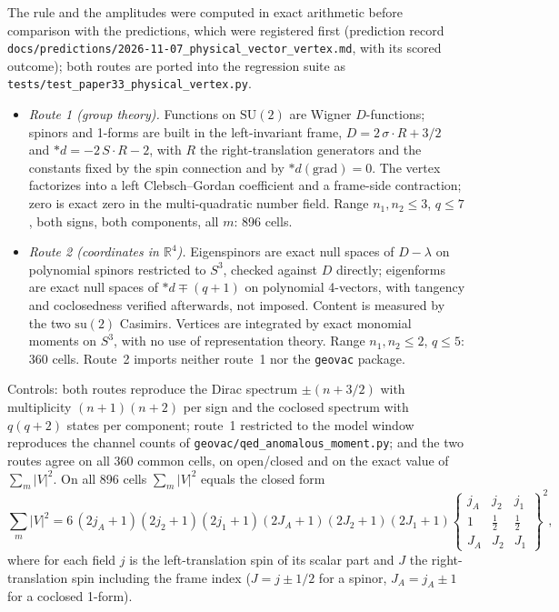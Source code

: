 \documentclass[11pt]{article}
\begin{document}
The rule and the amplitudes were computed in exact arithmetic before
comparison with the predictions, which were registered first
(prediction record
\texttt{docs/predictions/2026-11-07\_physical\_vector\_vertex.md},
with its scored outcome); both routes are ported into the regression
suite as \texttt{tests/test\_paper33\_physical\_vertex.py}.
\begin{itemize}
\item \emph{Route 1 (group theory).}  Functions on $\mathrm{SU}(2)$ are
  Wigner $D$-functions; spinors and 1-forms are built in the
  left-invariant frame, $D = 2\,\sigma\cdot R + 3/2$ and
  $*d = -2\,S\cdot R - 2$, with $R$ the right-translation generators and
  the constants fixed by the spin connection and by $*d(\mathrm{grad}) = 0$.
  The vertex factorizes into a left Clebsch--Gordan coefficient and a
  frame-side contraction; zero is exact zero in the multi-quadratic
  number field.  Range $n_1, n_2 \le 3$, $q \le 7$, both signs, both
  components, all $m$: 896 cells.
\item \emph{Route 2 (coordinates in $\mathbb{R}^4$).}  Eigenspinors are
  exact null spaces of $D - \lambda$ on polynomial spinors restricted to
  $S^3$, checked against $D$ directly; eigenforms are exact null spaces
  of $*d \mp (q+1)$ on polynomial 4-vectors, with tangency and
  coclosedness verified afterwards, not imposed.  Content is measured by
  the two $\mathrm{su}(2)$ Casimirs.  Vertices are integrated by exact
  monomial moments on $S^3$, with no use of representation theory.
  Range $n_1, n_2 \le 2$, $q \le 5$: 360 cells.  Route~2 imports neither
  route~1 nor the \texttt{geovac} package.
\end{itemize}
Controls: both routes reproduce the Dirac spectrum $\pm(n + 3/2)$ with
multiplicity $(n+1)(n+2)$ per sign and the coclosed spectrum with
$q(q+2)$ states per component; route~1 restricted to the model window
reproduces the channel counts of \texttt{geovac/qed\_anomalous\_moment.py};
and the two routes agree on all 360 common cells, on open/closed and on
the exact value of $\sum_m |V|^2$.  On all 896 cells $\sum_m |V|^2$ equals
the closed form
\begin{equation}
  \sum_m |V|^2 = 6\,(2j_A{+}1)(2j_2{+}1)(2j_1{+}1)(2J_A{+}1)(2J_2{+}1)(2J_1{+}1)
  \begin{Bmatrix} j_A & j_2 & j_1 \\ 1 & \tfrac12 & \tfrac12 \\
  J_A & J_2 & J_1 \end{Bmatrix}^{2},
  \label{eq:ninej}
\end{equation}
where for each field $j$ is the left-translation spin of its scalar
part and $J$ the right-translation spin including the frame index
($J = j \pm 1/2$ for a spinor, $J_A = j_A \pm 1$ for a coclosed 1-form).
\end{document}
